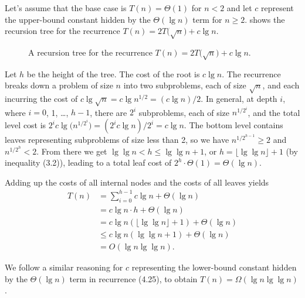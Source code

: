 Let's assume that the base case is $T(n)=\Theta(1)$ for $n<2$ and let $c$ represent the upper-bound constant hidden by the $\Theta(\lg n)$ term for $n\ge2$.
 shows the recursion tree for the recurrence $T(n)=2T\bigl(\sqrt{n}\bigr)+c\lg n$.
\begin{figure}[htb]
    
    \caption{A recursion tree for the recurrence $T(n)=2T\bigl(\sqrt{n}\bigr)+c\lg n$.} \label{fig:4-3}
\end{figure}

Let $h$ be the height of the tree.
The cost of the root is $c\lg n$.
The recurrence breaks down a problem of size $n$ into two subproblems, each of size $\sqrt{n}$, and each incurring the cost of $c\lg\sqrt{n}=c\lg n^{1/2}=(c\lg n)/2$.
In general, at depth $i$, where $i=0$, 1, \dots, $h-1$, there are $2^i$ subproblems, each of size $n^{1/2^i}$\!, and the total level cost is $2^ic\lg\bigl(n^{1/2^i}\!\bigr)=(2^ic\lg n)/2^i=c\lg n$.
The bottom level contains leaves representing subproblems of size less than 2, so we have $n^{1/2^{h-1}}\!\ge2$ and $n^{1/2^h}\!<2$.
From there we get $\lg\lg n<h\le\lg\lg n+1$, or $h=\lfloor\lg\lg n\rfloor+1$ (by inequality (3.2)), leading to a total leaf cost of $2^h\cdot\Theta(1)=\Theta(\lg n)$.

Adding up the costs of all internal nodes and the costs of all leaves yields
\begin{align*}
    T(n) &= \sum_{i=0}^{h-1}c\lg n+\Theta(\lg n) \\
    &= c\lg n\cdot h+\Theta(\lg n) \\
    &= c\lg n(\lfloor\lg\lg n\rfloor+1)+\Theta(\lg n) \\
    &\le c\lg n(\lg\lg n+1)+\Theta(\lg n) \\
    &= O(\lg n\lg\lg n).
\end{align*}

We follow a similar reasoning for $c$ representing the lower-bound constant hidden by the $\Theta(\lg n)$ term in recurrence (4.25), to obtain $T(n)=\Omega(\lg n\lg\lg n)$.

